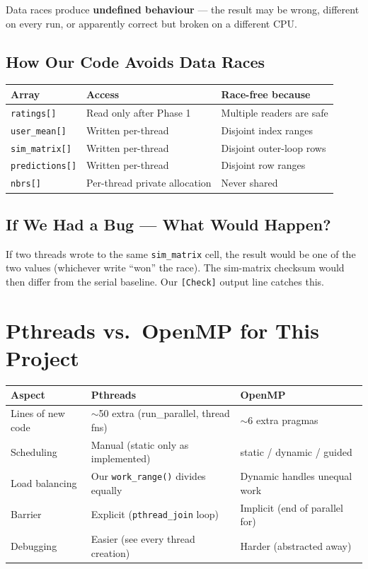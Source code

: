 \documentclass[12pt,a4paper]{article}
\begin{document}
Data races produce \textbf{undefined behaviour} — the result may be wrong,
different on every run, or apparently correct but broken on a different CPU.

\subsection{How Our Code Avoids Data Races}

\begin{center}
\begin{tabular}{lll}
\toprule
Array & Access & Race-free because \\
\midrule
\texttt{ratings[]} & Read only after Phase 1 & Multiple readers are safe \\
\texttt{user\_mean[]} & Written per-thread & Disjoint index ranges \\
\texttt{sim\_matrix[]} & Written per-thread & Disjoint outer-loop rows \\
\texttt{predictions[]} & Written per-thread & Disjoint row ranges \\
\texttt{nbrs[]} & Per-thread private allocation & Never shared \\
\bottomrule
\end{tabular}
\end{center}

\subsection{If We Had a Bug — What Would Happen?}

If two threads wrote to the same \texttt{sim\_matrix} cell, the result would
be one of the two values (whichever write ``won'' the race).  The
sim-matrix checksum would then differ from the serial baseline.  Our
\texttt{[Check]} output line catches this.

\section{Pthreads vs.\ OpenMP for This Project}

\begin{center}
\begin{tabular}{lll}
\toprule
Aspect & Pthreads & OpenMP \\
\midrule
Lines of new code & $\sim$50 extra (run\_parallel, thread fns) & $\sim$6 extra pragmas \\
Scheduling & Manual (static only as implemented) & static / dynamic / guided \\
Load balancing & Our \texttt{work\_range()} divides equally & Dynamic handles unequal work \\
Barrier & Explicit (\texttt{pthread\_join} loop) & Implicit (end of parallel for) \\
Debugging & Easier (see every thread creation) & Harder (abstracted away) \\
\bottomrule
\end{tabular}
\end{center}
\end{document}

